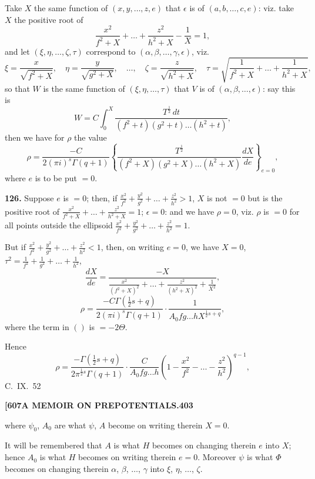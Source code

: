 \documentclass[11pt,a4paper]{book}
\begin{document}
{Take $X$ the same function of $(x, y, \ldots, z, e)$ that $\epsilon$ is of $(a, b, \ldots, c, e)$: viz. take $X$ the positive root of
\[
\frac{x^2}{f^2+X} + \ldots + \frac{z^2}{h^2+X} - \frac{1}{X} = 1,
\]
and let $(\xi, \eta, \ldots, \zeta, \tau)$ correspond to $(\alpha, \beta, \ldots, \gamma, \epsilon)$, viz.
\[
\xi = \frac{x}{\sqrt{f^2+X}},\quad \eta = \frac{y}{\sqrt{g^2+X}},\quad \ldots,\quad \zeta = \frac{z}{\sqrt{h^2+X}},\quad \tau = \sqrt{\frac{1}{f^2+X} + \ldots + \frac{1}{h^2+X}},
\]
so that $W$ is the same function of $(\xi, \eta, \ldots, \tau)$ that $V$ is of $(\alpha, \beta, \ldots, \epsilon)$: say this is
\[
W = C\int_0^X \frac{T^{\frac{1}{2}}\,dt}{(f^2+t)(g^2+t)\ldots(h^2+t)},
\]
then we have for $\rho$ the value
\[
\rho = \frac{-C}{2(\pi i)^s \Gamma(q+1)} \left\{ \frac{T^{\frac{1}{2}}}{(f^2+X)(g^2+X)\ldots(h^2+X)} \frac{dX}{de} \right\}_{e=0},
\]
where $e$ is to be put $=0$.

\medskip
\noindent\textbf{126.}
Suppose $e$ is $=0$; then, if $\frac{x^2}{f^2} + \frac{y^2}{g^2} + \ldots + \frac{z^2}{h^2} > 1$, $X$ is not $=0$ but is the positive root of $\frac{x^2}{f^2+X} + \ldots + \frac{z^2}{h^2+X} = 1$; $\epsilon = 0$: and we have $\rho = 0$, viz. $\rho$ is $=0$ for all points outside the ellipsoid $\frac{x^2}{f^2} + \frac{y^2}{g^2} + \ldots + \frac{z^2}{h^2} = 1$.

But if $\frac{x^2}{f^2} + \frac{y^2}{g^2} + \ldots + \frac{z^2}{h^2} < 1$, then, on writing $e = 0$, we have $X = 0$, $\tau^2 = \frac{1}{f^2} + \frac{1}{g^2} + \ldots + \frac{1}{h^2}$,
\[
\frac{dX}{de} = \frac{-X}{\frac{x^2}{(f^2+X)^2} + \ldots + \frac{z^2}{(h^2+X)^2} + \frac{1}{X^2}},
\]
\[
\rho = \frac{-C\Gamma(\tfrac{1}{2}s+q)}{2(\pi i)^s \Gamma(q+1)} \cdot \frac{1}{A_0 f g \ldots h X^{\frac{1}{2}s+q}},
\]
where the term in $()$ is $= -2\Theta$.

Hence
\[
\rho = \frac{-\Gamma(\tfrac{1}{2}s+q)}{2\pi^{\frac{1}{2}s} \Gamma(q+1)} \cdot \frac{C}{A_0 f g \ldots h} \left(1 - \frac{x^2}{f^2} - \ldots - \frac{z^2}{h^2}\right)^{q-1},
\]
\hfill C.~IX.\ 52

\newpage
\noindent\textbf{[607}\hspace{\fill}\textbf{A MEMOIR ON PREPOTENTIALS.}\hspace{\fill}\textbf{403}

where $\psi_0$, $A_0$ are what $\psi$, $A$ become on writing therein $X = 0$.

It will be remembered that $A$ is what $H$ becomes on changing therein $e$ into $X$; hence $A_0$ is what $H$ becomes on writing therein $e = 0$. Moreover $\psi$ is what $\Phi$ becomes on changing therein $\alpha$, $\beta$, $\ldots$, $\gamma$ into $\xi$, $\eta$, $\ldots$, $\zeta$.

}
\end{document}
